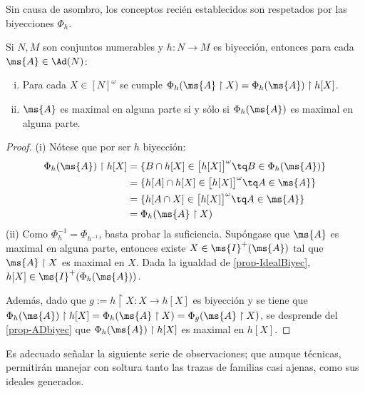 	Sin causa de asombro, los conceptos recién establecidos son respetados por las biyecciones $\Phi_h$.
	
	\begin{proposicion}
		Si $N,M$ son conjuntos numerables y $h:N \to M$ es biyección, entonces para cada $\ms{A} \in \Ad(N)$:
		\begin{enumerate}[i)]
			\item Para cada $X \in [N]^\omega$ se cumple $\Phi_h(\ms{A} \upharpoonright X)=\Phi_h(\ms{A}) \upharpoonright h[X]$.
			\item $\ms{A}$ es maximal en alguna parte si y sólo si $\Phi_h(\ms{A})$ es maximal en alguna parte.
		\end{enumerate}
	\end{proposicion}
	
	\begin{proof}
		(i) Nótese que por ser $h$ biyección:
		\begin{align*}
		\Phi_h(\ms{A}) \upharpoonright h[X] & = \{ B \cap h[X] \in \big[ h[X] \big]^\omega \tq B \in \Phi_h(\ms{A}) \} \\
		& = \{ h[A] \cap h[X] \in \big[ h[X] \big]^\omega \tq A \in \ms{A} \} \\
		& = \{ h[A \cap X] \in \big[ h[X] \big]^\omega \tq A \in \ms{A} \} \\
		& = \Phi_h (\ms{A} \upharpoonright X)
		\end{align*}	
		(ii) Como $\Phi_h ^{-1} = \Phi_{h^{-1}}$, basta probar la suficiencia. Supóngase que $\ms{A}$ es maximal en alguna parte, entonces existe $X \in \ms{I}^+(\ms{A})$ tal que $\ms{A} \upharpoonright X$ es maximal en $X$. Dada la igualdad de \ref{prop-IdealBiyec}, $h[X] \in \ms{I}^+(\Phi_h(\ms{A}))$.
		
		Además, dado que $g:= h \upharpoonright X : X \to h[X]$ es biyección y se tiene que $\Phi_h(\ms{A}) \upharpoonright h[X]=\Phi_h (\ms{A} \upharpoonright X)=\Phi_g (\ms{A} \upharpoonright X)$, se desprende del \autoref{prop-ADbiyec} que $\Phi_h(\ms{A}) \upharpoonright h[X]$ es maximal en $h[X]$. 
	\end{proof}
	
	Es adecuado señalar la siguiente serie de observaciones; que aunque técnicas, permitirán manejar con soltura tanto las trazas de familias casi ajenas, como sus ideales generados.
	
